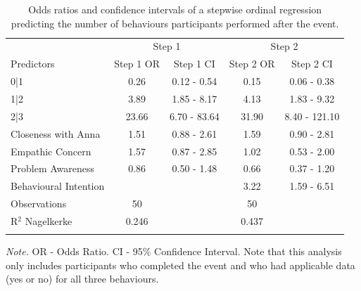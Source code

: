 \documentclass[
  man,floatsintext]{apa6}
\begin{document}
\begin{table}[tbp]

\begin{center}
\begin{threeparttable}

\caption{\label{tab:behaviour-intention}Odds ratios and confidence intervals of a stepwise ordinal regression predicting the number of behaviours participants performed after the event.}

\begin{tabular}{lcccc}
\toprule
 & \multicolumn{2}{c}{Step 1} & \multicolumn{2}{c}{Step 2} \\
\cmidrule(r){2-3} \cmidrule(r){4-5}
Predictors & \multicolumn{1}{c}{Step 1 OR} & \multicolumn{1}{c}{Step 1 CI} & \multicolumn{1}{c}{Step 2 OR} & \multicolumn{1}{c}{Step 2 CI}\\
\midrule
0|1 & 0.26 & 0.12 - 0.54 & 0.15 & 0.06 - 0.38\\
1|2 & 3.89 & 1.85 - 8.17 & 4.13 & 1.83 - 9.32\\
2|3 & 23.66 & 6.70 - 83.64 & 31.90 & 8.40 - 121.10\\
Closeness with Anna & 1.51 & 0.88 - 2.61 & 1.59 & 0.90 - 2.81\\
Empathic Concern & 1.57 & 0.87 - 2.85 & 1.02 & 0.53 - 2.00\\
Problem Awareness & 0.86 & 0.50 - 1.48 & 0.66 & 0.37 - 1.20\\
Behavioural Intention &  &  & 3.22 & 1.59 - 6.51\\ \midrule
Observations & 50 &  & 50 & \\
R$^2$ Nagelkerke & 0.246 &  & 0.437 & \\
\bottomrule
\addlinespace
\end{tabular}

\begin{tablenotes}[para]
\normalsize{\textit{Note.} OR - Odds Ratio. CI - 95\% Confidence Interval. Note that this analysis only includes participants who completed the event and who had applicable data (yes or no) for all three behaviours.}
\end{tablenotes}

\end{threeparttable}
\end{center}

\end{table}
\end{document}
